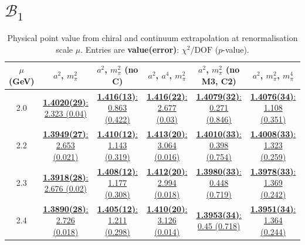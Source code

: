 \documentclass[12pt]{extarticle}
\begin{document}
\section{$\mathcal{B}_1$}
\begin{table}[h!]
\begin{center}
\begin{tabular}{|c|c|c|c|c|c|}
\hline
$\mu$ (GeV) & $a^2$, $m_\pi^2$& $a^2$, $m_\pi^2$ (no C)& $a^2$, $a^4$, $m_\pi^2$& $a^2$, $m_\pi^2$ (no M3, C2)& $a^2$, $m_\pi^2$, $m_\pi^4$\\
\hline
2.0& \hyperlink{VVpAA/NPR/a2m2_20.pdf.1}{\textbf{1.4020(29)}: 2.323 (0.04)} & \hyperlink{VVpAA/NPR/a2m2noC_20.pdf.1}{\textbf{1.416(13)}: 0.863 (0.422)} & \hyperlink{VVpAA/NPR/a2a4m2_20.pdf.1}{\textbf{1.416(22)}: 2.677 (0.03)} & \hyperlink{VVpAA/NPR/a2m2mcut_20.pdf.1}{\textbf{1.4079(32)}: 0.271 (0.846)} & \hyperlink{VVpAA/NPR/a2m2m4_20.pdf.1}{\textbf{1.4076(34)}: 1.108 (0.351)}\\
2.2& \hyperlink{VVpAA/NPR/a2m2_22.pdf.1}{\textbf{1.3949(27)}: 2.653 (0.021)} & \hyperlink{VVpAA/NPR/a2m2noC_22.pdf.1}{\textbf{1.410(12)}: 1.143 (0.319)} & \hyperlink{VVpAA/NPR/a2a4m2_22.pdf.1}{\textbf{1.413(20)}: 3.064 (0.016)} & \hyperlink{VVpAA/NPR/a2m2mcut_22.pdf.1}{\textbf{1.4010(33)}: 0.398 (0.754)} & \hyperlink{VVpAA/NPR/a2m2m4_22.pdf.1}{\textbf{1.4008(33)}: 1.323 (0.259)}\\
2.3& \hyperlink{VVpAA/NPR/a2m2_23.pdf.1}{\textbf{1.3918(28)}: 2.676 (0.02)} & \hyperlink{VVpAA/NPR/a2m2noC_23.pdf.1}{\textbf{1.408(12)}: 1.177 (0.308)} & \hyperlink{VVpAA/NPR/a2a4m2_23.pdf.1}{\textbf{1.412(20)}: 2.994 (0.018)} & \hyperlink{VVpAA/NPR/a2m2mcut_23.pdf.1}{\textbf{1.3980(33)}: 0.448 (0.719)} & \hyperlink{VVpAA/NPR/a2m2m4_23.pdf.1}{\textbf{1.3978(33)}: 1.369 (0.242)}\\
2.4& \hyperlink{VVpAA/NPR/a2m2_24.pdf.1}{\textbf{1.3890(28)}: 2.726 (0.018)} & \hyperlink{VVpAA/NPR/a2m2noC_24.pdf.1}{\textbf{1.405(12)}: 1.211 (0.298)} & \hyperlink{VVpAA/NPR/a2a4m2_24.pdf.1}{\textbf{1.410(20)}: 3.126 (0.014)} & \hyperlink{VVpAA/NPR/a2m2mcut_24.pdf.1}{\textbf{1.3953(34)}: 0.45 (0.718)} & \hyperlink{VVpAA/NPR/a2m2m4_24.pdf.1}{\textbf{1.3951(34)}: 1.364 (0.244)}\\
\hline
\end{tabular}
\caption{Physical point value from chiral and continuum extrapolation at renormalisation scale $\mu$. Entries are \textbf{value(error)}: $\chi^2/\text{DOF}$ ($p$-value).}
\end{center}
\end{table}
\end{document}
